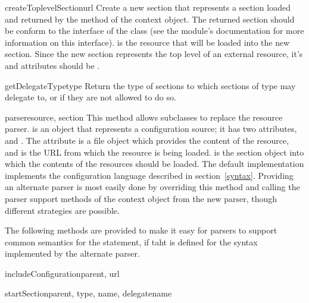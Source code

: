 \documentclass{howto}
\begin{document}
\begin{methoddesc}{createToplevelSection}{url}
  Create a new section that represents a section loaded and returned
  by the  method of the context object.  The returned
  section should be conform to the interface of the
   class (see the
   module's documentation for more
  information on this interface).   is the resource that will
  be loaded into the new section.
  Since the new section represents the top level of an external
  resource, it's  and  attributes should be
  .
\end{methoddesc}

\begin{methoddesc}{getDelegateType}{type}
  Return the type of sections to which sections of type  may
  delegate to, or  if they are not allowed to do so.
\end{methoddesc}

\begin{methoddesc}{parse}{resource, section}
  This method allows subclasses to replace the resource parser.
   is an object that represents a configuration source;
  it has two attributes,  and .  The
   attribute is a file object which provides the content
  of the resource, and  is the URL from which the resource
  is being loaded.   is the section object into which the
  contents of the resources should be loaded.  The default
  implementation implements the configuration language described in
  section~\ref{syntax}.  Providing an
  alternate parser is most easily done by overriding this method and
  calling the parser support methods of the context object from the
  new parser, though different strategies are possible.
\end{methoddesc}

The following methods are provided to make it easy for parsers to
support common semantics for the  statement, if
taht is defined for the syntax implemented by the alternate parser.

\begin{methoddesc}{includeConfiguration}{parent, url}
\end{methoddesc}

\begin{methoddesc}{startSection}{parent, type, name, delegatename}
\end{methoddesc}
\end{document}
